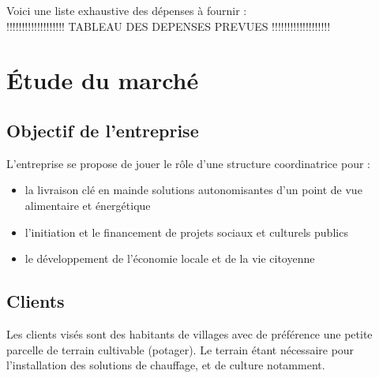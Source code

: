 \documentclass[10pt]{article}
\begin{document}
Voici une liste exhaustive des dépenses à fournir : \\
!!!!!!!!!!!!!!!!!!! TABLEAU DES DEPENSES PREVUES !!!!!!!!!!!!!!!!!!!
\begin{figure}[position]
\end{figure}



\section{Étude du marché}
\label{sec:marche}

\subsection{Objectif de l'entreprise}
\label{sec:objectifs}

L'entreprise se propose de jouer le rôle d'une structure coordinatrice pour :
\begin{itemize}
	\item la livraison \og{}clé en main\fg{~}de solutions autonomisantes d'un point de vue alimentaire et énergétique
	\item l'initiation et le financement de projets sociaux et culturels publics
	\item le développement de l'économie locale et de la vie citoyenne
\end{itemize}



\subsection{Clients}
\label{sub:client}
Les clients visés sont des habitants de villages avec de préférence une petite parcelle de terrain cultivable (potager).
Le terrain étant nécessaire pour l'installation des solutions de chauffage, et de culture notamment.
\end{document}

